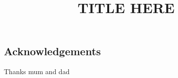 \documentclass[a4paper,11pt,twoside]{report}
\title{TITLE HERE}
\author{}
\begin{document}
\maketitle


\begin{center}
\section*{Acknowledgements}
Thanks mum and dad 
\end{center}
	
\clearpage
	
\end{document}
